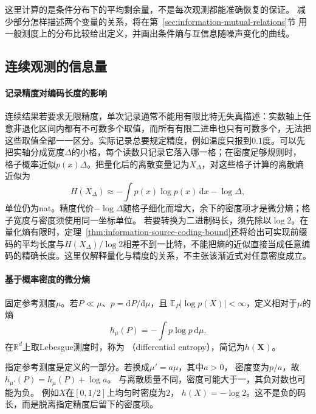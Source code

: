 这里计算的是条件分布下的平均剩余量，不是每次观测都能准确恢复的保证。
减少部分怎样描述两个变量的关系，将在第~\ref{sec:information-mutual-relations}节
用一般测度上的分布比较给出定义，并画出条件熵与互信息随噪声变化的曲线。

\subsection{连续观测的信息量}
\label{sec:information-continuous-information}

\paragraph{记录精度对编码长度的影响}
连续结果若要求无限精度，单次记录通常不能用有限比特无失真描述：实数轴上任意非退化区间内都有不可数多个取值，而所有有限二进串也只有可数多个，无法把这些取值全部一一区分。实际记录总要规定精度，例如温度只报到\(0.1\)度。可以先把实轴分成宽度\(\Delta\)的小格，每个读数只记录它落入哪一格；在密度足够规则时，
格子概率近似\(p(x)\Delta\)。把量化后的离散变量记为\(X_\Delta\)，对这些格子计算的离散熵近似为
\[
 H(X_\Delta)\approx-\int p(x)\log p(x)\,\mathrm dx-\log\Delta,
\]
单位仍为nat。精度代价\(-\log\Delta\)随格子细化而增大，余下的密度项才是微分熵；格子宽度与密度须使用同一坐标单位。
若要转换为二进制码长，须先除以\(\log2\)。在量化熵有限时，定理~\ref{thm:information-source-coding-bound}还将给出可实现前缀码的平均长度与\(H(X_\Delta)/\log2\)相差不到一比特，不能把熵的近似直接当成任意编码的精确长度。这里仅解释量化与精度的关系，不主张该渐近式对任意密度成立。

\paragraph{基于概率密度的微分熵}
\begin{definition}[微分熵]
\label{def:information-differential-entropy}
固定参考测度\(\mu\)。若\(P\ll\mu\)、\(p=\mathrm dP/\mathrm d\mu\)，且
\(\mathbb E_P|\log p(X)|<\infty\)，定义相对于\(\mu\)的熵
\[
  h_\mu(P)=-\int p\log p\,\mathrm d\mu.
\]
在\(\mathbb R^d\)上取Lebesgue测度时，称为
（differential entropy），简记为\(h(\bm X)\)。
\end{definition}

指定参考测度是定义的一部分。若换成\(\mu'=a\mu\)，其中\(a>0\)，
密度变为\(p/a\)，故\(h_{\mu'}(P)=h_\mu(P)+\log a\)。
与离散质量不同，密度可能大于一，其负对数也可能为负。
例如\(X\)在\([0,1/2]\)上均匀时密度为\(2\)，
\(h(X)=-\log2\)。这不是负的码长，而是脱离指定精度后留下的密度项。

